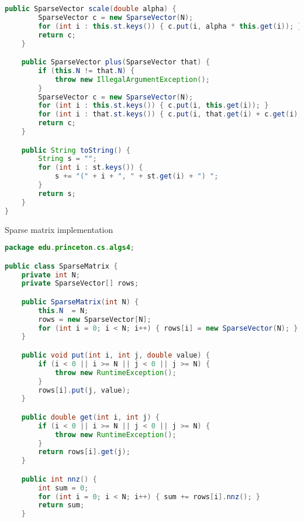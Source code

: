 \documentclass[8pt,a4paper,compress]{beamer}
\begin{document}
\begin{frame}[fragile]
\pause

\begin{lstlisting}[language=java,style=focusin]
    public SparseVector scale(double alpha) {
        SparseVector c = new SparseVector(N);
        for (int i : this.st.keys()) { c.put(i, alpha * this.get(i)); }
        return c;
    }

    public SparseVector plus(SparseVector that) {
        if (this.N != that.N) {
            throw new IllegalArgumentException(); 
        }
        SparseVector c = new SparseVector(N);
        for (int i : this.st.keys()) { c.put(i, this.get(i)); }
        for (int i : that.st.keys()) { c.put(i, that.get(i) + c.get(i)); } 
        return c;
    }

    public String toString() {
        String s = "";
        for (int i : st.keys()) {
            s += "(" + i + ", " + st.get(i) + ") ";
        }
        return s;
    }
}
\end{lstlisting}
\end{frame}

\begin{frame}[fragile]
\pause

Sparse matrix implementation
\begin{lstlisting}[language=java,style=focusin]
package edu.princeton.cs.algs4;

public class SparseMatrix {
    private int N; 
    private SparseVector[] rows; 

    public SparseMatrix(int N) {
        this.N  = N;
        rows = new SparseVector[N];
        for (int i = 0; i < N; i++) { rows[i] = new SparseVector(N); }
    }

    public void put(int i, int j, double value) {
        if (i < 0 || i >= N || j < 0 || j >= N) { 
            throw new RuntimeException(); 
        }
        rows[i].put(j, value);
    }

    public double get(int i, int j) {
        if (i < 0 || i >= N || j < 0 || j >= N) { 
            throw new RuntimeException(); 
        }
        return rows[i].get(j);
    }

    public int nnz() { 
        int sum = 0;
        for (int i = 0; i < N; i++) { sum += rows[i].nnz(); }
        return sum;
    }
\end{lstlisting}
\end{frame}
\end{document}
